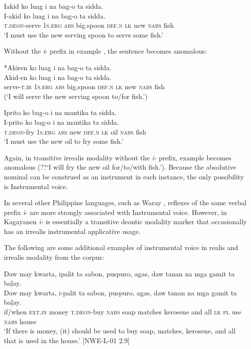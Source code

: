 \ea
\label{ex:servesomefish}
Iakid	ko	luag	i	na	bag-o	ta	sidda. \\\smallskip
\gll I-akid	ko	\emptyset{}	luag	i	na	bag-o	ta	sidda. \\
\textsc{t.deon}-serve	1\textsc{s.erg}	\textsc{abs}	big.spoon	\textsc{def.n}	\textsc{lk}	new	\textsc{nabs}	fish \\
\glt ‘I must use the new serving spoon to serve some fish.’
\z

Without the \textit{i}- prefix in example , the sentence becomes anomalous:

\ea
*Akiren	ko luag	i	na	bag-o	ta	sidda. \\\smallskip
\gll *Akid-en	ko	\emptyset{}	luag	i	na	bag-o	ta	sidda. \\
serve-\textsc{t.ir}	1\textsc{s.erg}	\textsc{abs}	big.spoon	\textsc{def.n}	\textsc{lk}	new	\textsc{nabs}	fish \\
\glt (‘I will serve the new serving spoon to/for fish.’)
\z

\ea
\label{bkm:Ref500142287}
Iprito  ko  bag-o  i  na  mantika  ta  sidda. \\\smallskip
\gll I-prito  ko  \emptyset{}  bag-o  i  na  mantika  ta  sidda. \\
\textsc{t.deon}-fry  1\textsc{s.erg}  \textsc{abs}  new  \textsc{def.n}  \textsc{lk}  oil \textsc{nabs}  fish \\
\glt ‘I must use the new oil to fry some fish.’
\z

Again, in transitive irrealis modality without the \textit{i-} prefix, example  becomes anomalous (??‘I will fry the new oil for/to/with fish.’). Because the absolutive nominal can be construed as an instrument in each instance, the only possibility is Instrumental voice. 

In several other Philippine languages, such as Waray \citep{payneoyzon2022}, reflexes of the same verbal prefix \textit{i}- are more strongly associated with Instrumental voice. However, in Kagayanen \textit{i-} is essentially a transitive deontic modality marker that occasionally has an irrealis instrumental applicative usage. 

The following are some additional examples of instrumental voice in realis and irrealis modality from the corpus:

\ea
\label{ex:inthehouse}
Daw   may kwarta, ipalit ta sabon, puspuro, agas, daw tanan na mga gamit ta baļay. \\\smallskip
\gll Daw   may kwarta, i-palit ta sabon, puspuro, agas, daw tanan na mga gamit ta baļay. \\
if/when	\textsc{ext.in}	money	\textsc{t.deon}-buy	\textsc{nabs}	soap	matches	kerosene and	all	\textsc{lk}	\textsc{pl}	use	\textsc{nabs}	house \\
\glt `If there is money, (it) should be used to buy soap, matches, kerosene, and all that is used in the house.’ [NWE-L-01 2.9]
\z


